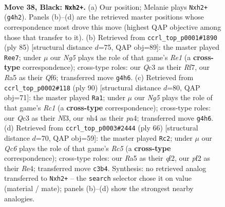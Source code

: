 \documentclass[11pt]{article}
\begin{document}
\clearpage

\begin{figure}[p]\centering
\begin{subfigure}{0.46\textwidth}\centering
\resizebox{\linewidth}{!}{%
\newchessgame
\chessboard[
  setfen={2r3k1/3n2p1/1p6/r2p3Q/P3p1nN/2q5/2P2P1P/R2R1K2 b - - 0 38},
  showmover=false,
  pgfstyle=straightmove, color=movearrow, markmove={g4-h2}
]}
\caption{}
\end{subfigure}\hfill
\begin{subfigure}{0.46\textwidth}\centering
\resizebox{\linewidth}{!}{%
\newchessgame
\chessboard[
  setfen={4r1k1/p4r2/1nQ1pq2/1P1p1P1p/3P2p1/4P1P1/3NR3/5RK1 b - - 7 43},
  showmover=false,
  pgfstyle=straightmove, color=movearrow, markmove={e8-e7}
]}
\caption{}
\end{subfigure}
\\[4pt]
\begin{subfigure}{0.46\textwidth}\centering
\resizebox{\linewidth}{!}{%
\newchessgame
\chessboard[
  setfen={2rr2k1/6p1/6np/1P1p1p2/p1pQ3P/q3PN2/5PP1/2RR1K2 w - - 0 46},
  showmover=false,
  pgfstyle=straightmove, color=movearrow, markmove={c1-a1}
]}
\caption{}
\end{subfigure}\hfill
\begin{subfigure}{0.46\textwidth}\centering
\resizebox{\linewidth}{!}{%
\newchessgame
\chessboard[
  setfen={3rr1k1/5pp1/2Q5/1pR1P2p/4RP2/7P/5qPK/8 w - - 0 34},
  showmover=false,
  pgfstyle=straightmove, color=movearrow, markmove={c5-c2}
]}
\caption{}
\end{subfigure}
\caption{\textbf{Move 38, Black: \texttt{Nxh2+}.} (a) Our position; Melanie plays \texttt{Nxh2+} (\texttt{g4h2}). Panels (b)--(d) are the retrieved master positions whose correspondence most drove this move (highest QAP objective among those that transfer to it). (b) Retrieved from \texttt{ccrl\_top\_p0001\#1890} (ply 85) [structural distance $d$=75, QAP obj=89]: the master played \texttt{Ree7}; under $\mu$ our \emph{Ng5} plays the role of that game's \emph{Re1} (a \textbf{cross-type} correspondence); cross-type roles: our \emph{Q}c3 as their \emph{R}f7, our \emph{R}a5 as their \emph{Q}f6; transferred move \texttt{g4h6}. (c) Retrieved from \texttt{ccrl\_top\_p0002\#118} (ply 90) [structural distance $d$=80, QAP obj=71]: the master played \texttt{Ra1}; under $\mu$ our \emph{Ng5} plays the role of that game's \emph{Rc1} (a \textbf{cross-type} correspondence); cross-type roles: our \emph{Q}c3 as their \emph{N}f3, our \emph{n}h4 as their \emph{p}a4; transferred move \texttt{g4h6}. (d) Retrieved from \texttt{ccrl\_top\_p0003\#2444} (ply 66) [structural distance $d$=70, QAP obj=59]: the master played \texttt{Rc2}; under $\mu$ our \emph{Qc6} plays the role of that game's \emph{Rc5} (a \textbf{cross-type} correspondence); cross-type roles: our \emph{R}a5 as their \emph{q}f2, our \emph{p}f2 as their \emph{R}e4; transferred move \texttt{c3b4}. Synthesis: no retrieved analog transferred to \texttt{Nxh2+} -- the \texttt{search} selector chose it on value (material / mate); panels (b)--(d) show the strongest nearby analogies.}
\label{fig:thought-m75}
\end{figure}
\end{document}
